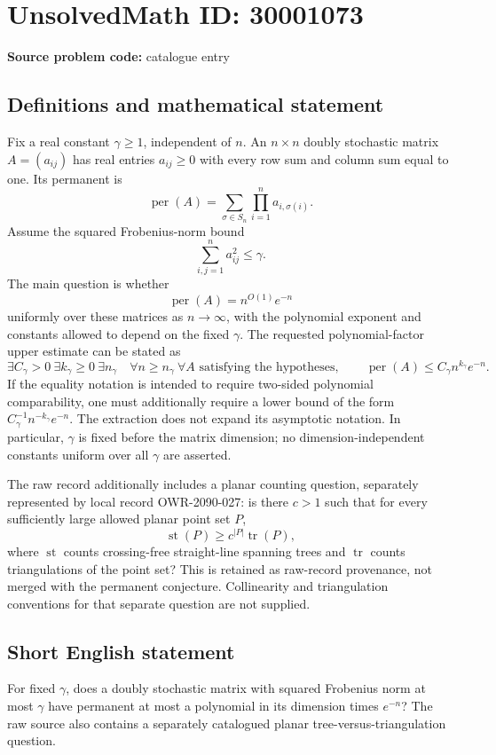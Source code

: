 \documentclass[11pt]{article}
\begin{document}
\section*{UnsolvedMath ID: 30001073}
\textbf{Source problem code:} catalogue entry
\subsection{Definitions and mathematical statement}
Fix a real constant \(\gamma\geq1\), independent of \(n\). An \(n\times n\) doubly stochastic matrix \(A=(a_{ij})\) has real entries \(a_{ij}\geq0\) with every row sum and column sum equal to one. Its permanent is
\[
\operatorname{per}(A)=\sum_{\sigma\in S_n}\prod_{i=1}^n a_{i,\sigma(i)}.
\]
Assume the squared Frobenius-norm bound
\[
\sum_{i,j=1}^n a_{ij}^2\leq\gamma.
\]
The main question is whether
\[
\operatorname{per}(A)=n^{O(1)}e^{-n}
\]
uniformly over these matrices as \(n\to\infty\), with the polynomial exponent and constants allowed to depend on the fixed \(\gamma\). The requested polynomial-factor upper estimate can be stated as
\[
\exists C_\gamma>0\ \exists k_\gamma\geq0\ \exists n_\gamma\quad
\forall n\geq n_\gamma\ \forall A\text{ satisfying the hypotheses},\qquad
\operatorname{per}(A)\leq C_\gamma n^{k_\gamma}e^{-n}.
\]
If the equality notation is intended to require two-sided polynomial comparability, one must additionally require a lower bound of the form \(C_\gamma^{-1}n^{-k_\gamma}e^{-n}\). The extraction does not expand its asymptotic notation. In particular, \(\gamma\) is fixed before the matrix dimension; no dimension-independent constants uniform over all \(\gamma\) are asserted.

The raw record additionally includes a planar counting question, separately represented by local record OWR-2090-027: is there \(c>1\) such that for every sufficiently large allowed planar point set \(P\),
\[
\operatorname{st}(P)\geq c^{|P|}\operatorname{tr}(P),
\]
where \(\operatorname{st}\) counts crossing-free straight-line spanning trees and \(\operatorname{tr}\) counts triangulations of the point set? This is retained as raw-record provenance, not merged with the permanent conjecture. Collinearity and triangulation conventions for that separate question are not supplied.
\subsection{Short English statement}
For fixed \(\gamma\), does a doubly stochastic matrix with squared Frobenius norm at most \(\gamma\) have permanent at most a polynomial in its dimension times \(e^{-n}\)? The raw source also contains a separately catalogued planar tree-versus-triangulation question.
\end{document}
